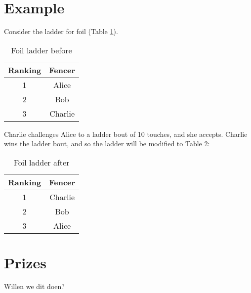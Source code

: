 \documentclass{article}
\begin{document}
\section{Example}
Consider the ladder for foil (Table \ref{tab:foil}).
\begin{table}[ht]
    \centering
    \begin{tabular}{|c|c|}
        \hline
        Ranking & Fencer \\ \hline
        1 & Alice \\ \hline
        2 & Bob \\ \hline
        3 & Charlie \\ \hline
    \end{tabular}
    \caption{Foil ladder before}
    \label{tab:foil}
\end{table}
Charlie challenges Alice to a ladder bout of 10 touches, and she accepts. Charlie wins the ladder bout, and so the ladder will be modified to Table \ref{tab:foil2}:
\begin{table}[ht]
    \centering
    \begin{tabular}{|c|c|}
        \hline
        Ranking & Fencer \\ \hline
        1 & Charlie \\ \hline
        2 & Bob \\ \hline
        3 & Alice \\ \hline
    \end{tabular}
    \caption{Foil ladder after}
    \label{tab:foil2}
\end{table}
\section{Prizes}
Willen we dit doen?
\end{document}
